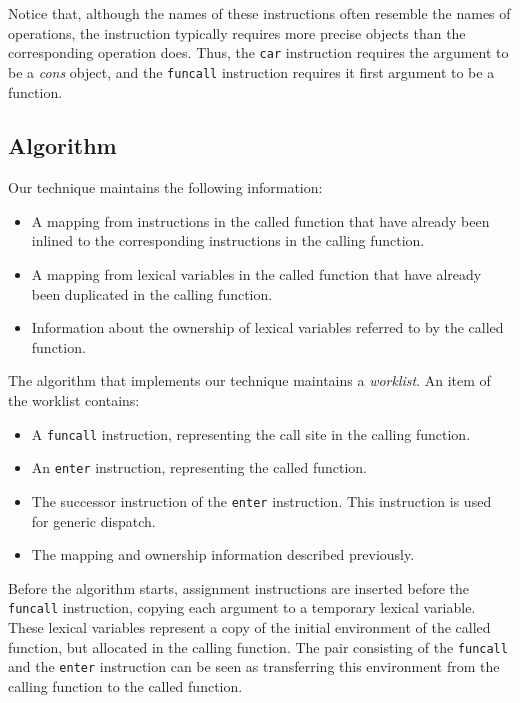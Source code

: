 Notice that, although the names of these instructions often resemble
the names of \commonlisp{} operations, the instruction typically
requires more precise objects than the corresponding \commonlisp{}
operation does.  Thus, the \texttt{car} instruction requires the
argument to be a \emph{cons} object, and the \texttt{funcall}
instruction requires it first argument to be a function.

\subsection{Algorithm}

Our technique maintains the following information:

\begin{itemize}
\item A mapping from instructions in the called function that have
  already been inlined to the corresponding instructions in the
  calling function.
\item A mapping from lexical variables in the called function that
  have already been duplicated in the calling function.
\item Information about the ownership of lexical variables referred to
  by the called function.
\end{itemize}

The algorithm that implements our technique maintains a
\emph{worklist}.  An item of the worklist contains:

\begin{itemize}
\item A \texttt{funcall} instruction, representing the call site in the
  calling function.
\item An \texttt{enter} instruction, representing the called function.
\item The successor instruction of the \texttt{enter} instruction.
  This instruction is used for generic dispatch.
\item The mapping and ownership information described previously.
\end{itemize}

Before the algorithm starts, assignment instructions are inserted
before the \texttt{funcall} instruction, copying each argument to a
temporary lexical variable.  These lexical variables represent a copy
of the initial environment of the called function, but allocated in
the calling function.  The pair consisting of the \texttt{funcall} and
the \texttt{enter} instruction can be seen as transferring this
environment from the calling function to the called function.

